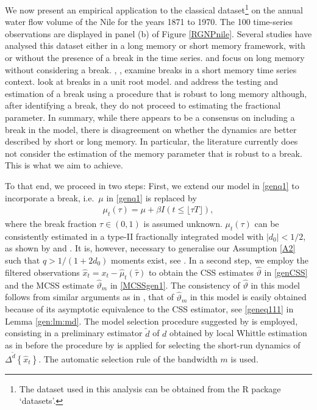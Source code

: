 {{We now present an empirical application to the classical dataset\footnote{ The dataset used in this analysis can be obtained from the R package `datasets'.} on the annual water flow volume of the Nile for the years 1871 to 1970. The 100 time-series observations are displayed in panel (b) of  Figure \ref{RGNPnile}. Several
studies have analysed this dataset either in a long memory or short memory framework, with or without the presence of a break in the time series. \textcite{hosking1984modeling} and \textcite{boes1989parameter} focus on long memory without
considering a break. \textcite{macneill1991search}, \textcite{wu2007inference}, \textcite{macneill2020multiple} examine breaks in a short memory time series context. \textcite{atkinson1997detecting} look at breaks in a unit root
model. \textcite{shao2011simple} and \textcite{bet17} address the testing and estimation of a break using a procedure that is robust to long memory although, after identifying a break, they do not proceed to estimating the fractional
parameter. In summary, while there appears to be a consensus on including a break in the model, there is disagreement on whether the dynamics are better described by short or long memory. In particular, the literature currently
does not consider the estimation of the memory parameter that is robust to a break. This is what we aim to achieve.


To that end, we proceed in two steps: First, we extend our model in \eqref{genq1} to incorporate a break, i.e.\ $\mu$ in \eqref{genq1} is replaced by
\begin{align}
    \mu_t(\tau) = \mu + \beta I(t \leq \lfloor \tau T \rfloor),  \label{determinNIle}
\end{align}
where the break fraction $\tau \in (0,1)$ is assumed unknown. $\mu_t (\tau)$ can be consistently estimated in a type-II fractionally integrated model with $|d_0| < 1/2$, as shown by \textcite{chang2016inference} and
\textcite{iacone2019testing}. It is, however, necessary to generalise our Assumption \ref{A2} such that $q > 1/(1+2d_0)$ moments exist, see \textcite[Theorem 2]{johansen2012necessary}. In a second step, we employ the filtered observations
$\hat{x}_t = x_t - \hat{\mu}_t(\hat{\tau})$ to obtain the CSS estimates $\hat{\vartheta}$ in \eqref{genCSS} and the MCSS estimate $\hat{\vartheta}_m$ in \eqref{MCSSgen1}. The consistency of $\hat{\vartheta}$ in this model follows from similar arguments as in
\textcite[Proposition 1]{robinson2015efficient}, that of $\hat \vartheta_m$ in this model is easily obtained because of its asymptotic equivalence to the CSS estimator, see \eqref{geneq111} in Lemma \ref{gen:lm:md}. The model selection procedure
suggested by \textcite{hualde2011gaussian} is employed, consisting in a preliminary estimator $\tilde{d}$ of $d$ obtained by local Whittle estimation as in \textcite{robinson1995gaussian} before the procedure by \textcite{box1990time} is
applied for selecting the short-run dynamics of $\Delta^{\tilde{d}} \left\{\hat{x}_t\right\}$. The \textcite{lobato1998nonparametric} automatic selection rule of the bandwidth $m$ is used.


}}
